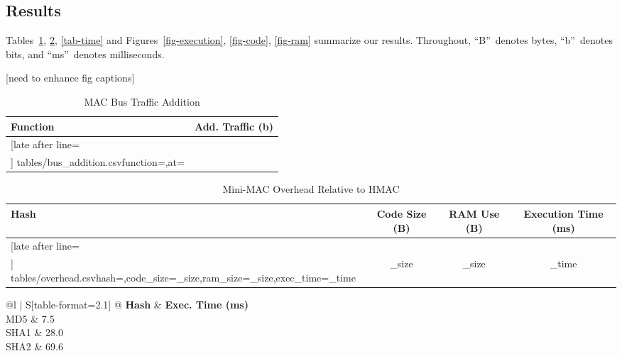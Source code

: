 \subsection{Results}
\label{results}

Tables~\ref{tab-traffic}, \ref{tab-overhead}, \ref{tab-time}
and Figures~\ref{fig-execution}, \ref{fig-code}, \ref{fig-ram}
summarize our results.
Throughout, ``B''~denotes bytes, ``b''~denotes bits, and ``ms''~denotes milliseconds.

[need to enhance fig captions]

	
	\begin{table}
	\centering
	\caption{MAC Bus Traffic Addition}
	\label{tab-traffic}
	\vspace{8pt}
	\begin{tabular}{l|c}%
	\bfseries Function & \bfseries Add. Traffic (b) \\\hline \csvreader[late after line=\\]%
		{tables/bus_addition.csv}{function=\function,at=\at}%
		{\function & \at}%
	\end{tabular}
	\end{table}

	\begin{table}	
	\centering	
	\caption{Mini-MAC Overhead Relative to HMAC}
	\label{tab-overhead}
	\vspace{8pt}
	\begin{tabular}{l|c|c|c}%
	\bfseries Hash & \bfseries Code Size (B) & \bfseries RAM Use (B) & \bfseries Execution Time (ms)\\\hline \csvreader[late after line=\\]%
		{tables/overhead.csv}{hash=\hash,code_size=\code_size,ram_size=\ram_size,exec_time=\exec_time}%
		{\hash & \code_size & \ram_size & \exec_time}%
	\end{tabular}
	\end{table}
	
	\begin{table}
	\centering
	\caption{Approximate Execution Time of Mini-MAC Construction}
	\label{tab-time}
	\vspace{8pt}
	\begin{tabular}{ @{}l | S[table-format=2.1]  @{}}
		\hspace{2pt}\textbf{Hash} & {\textbf{Exec. Time (ms)}} \\
		\hline 
		\hspace{2pt}MD5 & 7.5 \\
		\hspace{2pt}SHA1 & 28.0 \\
		\hspace{2pt}SHA2 & 69.6 \\ 
	\end{tabular}	
	\end{table}
	
